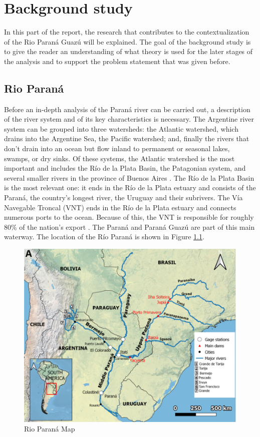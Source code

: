\chapter{Background study}
\label{chapter:background}
In this part of the report, the research that contributes to the contextualization of the Rio Paraná Guazú will be explained. The goal of the background study is to give the reader an understanding of what theory is used for the later stages of the analysis and to support the problem statement that was given before.

\section{Rio Paraná}
Before an in-depth analysis of the Paraná river can be carried out, a description of the river system and of its key characteristics is necessary. The Argentine river system can be grouped into three watersheds: the Atlantic watershed, which drains into the Argentine Sea, the Pacific watershed; and, finally the rivers that don't drain into an ocean but flow inland to permanent or seasonal lakes, swamps, or dry sinks. Of these systems, the Atlantic watershed is the most important and includes the Río de la Plata Basin, the Patagonian system, and several smaller rivers in the province of Buenos Aires \autocite{farberHydrographyArgentina2024}. The Río de la Plata Basin is the most relevant one: it ends in the Río de la Plata estuary and consists of the Paraná, the country's longest river, the Uruguay and their subrivers. The Vía Navegable Troncal (VNT) ends in the Río de la Plata estuary and connects numerous ports to the ocean. Because of this, the VNT is responsible for roughly 80\% of the nation's export \autocite{agencianacionaldepuertosynavegacionNavegableTroncal2025}. The Paraná and Paraná Guazú are part of this main waterway. The location of the Río Paraná is shown in Figure \ref{fig:rio parana map}.

\begin{figure}[h]
    \centering    \includegraphics[width=0.65\linewidth]{figures/ch2/map rio parana.png}
    \caption{Rio Paraná Map}
    \label{fig:rio parana map}
\end{figure}

